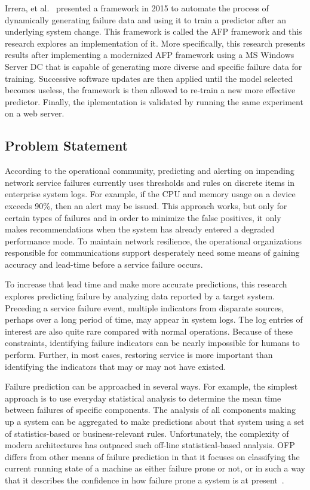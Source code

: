 Irrera, et al.~\cite{irrera2015} presented a framework in 2015 to automate the
process of dynamically generating failure data and using it to train a
predictor after an underlying system change.  This framework is called the
\ac{AFP} framework and this research explores an implementation of it.  More
specifically, this research presents results after implementing a modernized
\ac{AFP} framework using a \ac{MS} Windows Server \ac{DC} that is capable of
generating more diverse and specific failure data for training.  Successive
software updates are then applied until the model selected becomes useless, the
framework is then allowed to re-train a new more effective predictor.  Finally,
the iplementation is validated by running the same experiment on a web server.

\subsection{Problem Statement}
According to the operational community, predicting and alerting on impending
network service failures currently uses thresholds and rules on discrete items
in enterprise system logs.  For example, if the \ac{CPU} and memory usage on a
device exceeds 90\%, then an alert may be issued.  This approach works, but
only for certain types of failures and in order to minimize the false
positives, it only makes recommendations when the system has already entered a
degraded performance mode.  To maintain network resilience, the operational
organizations responsible for communications support desperately need some
means of gaining accuracy and lead-time before a service failure occurs.  

To increase that lead time and make more accurate predictions, this research
explores predicting failure by analyzing data reported by a target system.
Preceding a service failure event, multiple indicators from disparate sources,
perhaps over a long period of time, may appear in system logs.  The log entries
of interest are also quite rare compared with normal operations.  Because of
these constraints, identifying failure indicators can be nearly impossible for
humans to perform.  Further, in most cases, restoring service is more important
than identifying the indicators that may or may not have existed.  

Failure prediction can be approached in several ways. For example, the simplest
approach is to use everyday statistical analysis to determine the mean time
between failures of specific components. The analysis of all components making
up a system can be aggregated to make predictions about that system using a set
of statistics-based or business-relevant rules.  Unfortunately, the complexity
of modern architectures has outpaced such off-line statistical-based analysis.
\ac{OFP} differs from other means of failure prediction in that it focuses on
classifying the current running state of a machine as either failure prone or
not, or in such a way that it describes the confidence in how failure prone a
system is at present~\cite{salfnerSurvey}.

